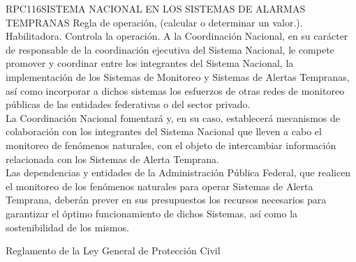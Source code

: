 \begin{BusinessRule}{RPC116}{SISTEMA NACIONAL EN LOS SISTEMAS DE ALARMAS TEMPRANAS}{
		Regla de operación, (calcular o determinar un valor.).
	}{
		Habilitadora. 
	}{
		Controla la operación. %
	}
	\BRItem[Descripción:] A la Coordinación Nacional, en su carácter de responsable de la coordinación ejecutiva del Sistema Nacional, le compete promover y coordinar entre los integrantes del Sistema Nacional, la implementación de los Sistemas de Monitoreo y Sistemas de Alertas Tempranas, así como incorporar a dichos sistemas los esfuerzos de otras redes de monitoreo públicas de las entidades federativas o del sector privado.\\La Coordinación Nacional fomentará y, en su caso, establecerá mecanismos de colaboración con los integrantes del Sistema Nacional que lleven a cabo el monitoreo de fenómenos naturales, con el objeto de intercambiar información relacionada con los Sistemas de Alerta Temprana.\\Las dependencias y entidades de la Administración Pública Federal, que realicen el monitoreo de los fenómenos naturales para operar Sistemas de Alerta Temprana, deberán prever en sus presupuestos los recursos necesarios para garantizar el óptimo funcionamiento de dichos Sistemas, así como la sostenibilidad de los mismos.
	
	
	 Reglamento de la Ley General de Protección Civil
\end{BusinessRule}